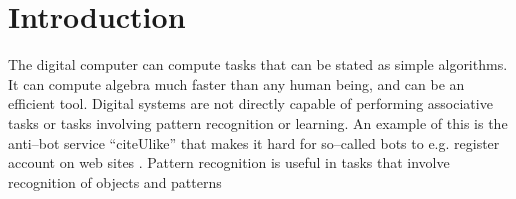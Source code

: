 

\section{Introduction}




	The digital computer can compute tasks that can be stated as simple algorithms.
	It can compute algebra much faster than any human being, and can be an efficient tool. %
	Digital systems are not directly capable of performing associative tasks or tasks involving pattern recognition or learning\cite{CITE}.
	An example of this is the anti--bot service ``citeUlike'' that makes it hard for so--called bots to e.g. register account on web sites%
	\cite{CITE?_artikkel_som_snakker_om_citeUlike, Heimesida_til_citeUlike}.
	Pattern recognition is useful in tasks that involve recognition of objects\cite{RobotisertIndustri, Bildegjenkjenning} and patterns \cite{artikkelSomViserMoenstergj.kj., enTilOmDet, endaEn, endaEn}


